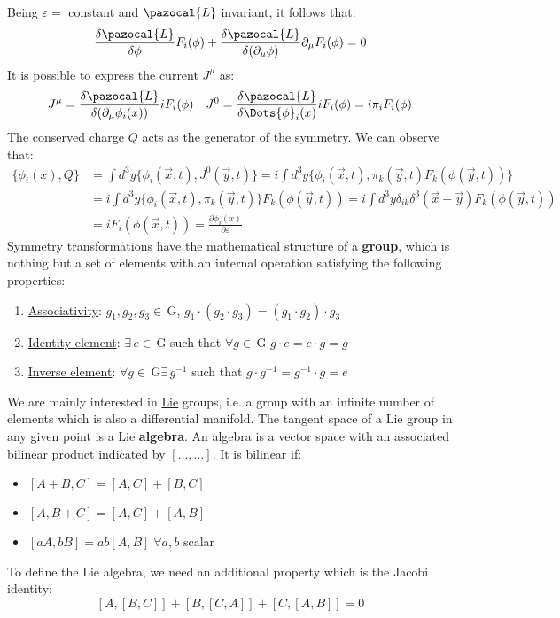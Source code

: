 \documentclass[../main.tex]{subfiles}
\begin{document}
Being $\varepsilon=$ constant and $\pazocal{L}$ invariant, it follows that:
\[
\frac{\delta\pazocal{L}}{\delta\phi}F_i(\phi)+\frac{\delta\pazocal{L}}{\delta(\partial_\mu\phi)}\partial_\mu F_i(\phi)=0
\]
It is possible to express the current $J^\mu$ as:
\[
J^\mu=\frac{\delta\pazocal{L}}{\delta(\partial_\mu\phi_i(x))}iF_i(\phi) \quad J^0=\frac{\delta\pazocal{L}}{\delta\Dots{\phi}_i(x)}iF_i(\phi)=i\pi_iF_i(\phi)
\]
The conserved charge $Q$ acts as the generator of the symmetry. We can observe that:
\begin{align*}
\{\phi_i(x),Q\}&=\int d^3y\{\phi_i(\Vec{x},t),J^0(\Vec{y},t)\}=i\int d^3y\{\phi_i(\Vec{x},t),\pi_k(\Vec{y},t)F_k(\phi(\Vec{y},t))\}\\
&=i\int d^3y\{\phi_i(\Vec{x},t),\pi_k(\Vec{y},t)\}F_k(\phi(\Vec{y},t))=i\int d^3y\delta_{ik}\delta^3(\Vec{x}-\Vec{y})F_k(\phi(\Vec{y},t))\\
&=iF_i(\phi(\Vec{x},t))=\frac{\partial\phi_i(x)}{\partial\varepsilon}
\end{align*}
Symmetry transformations have the mathematical structure of a \textbf{group}\cite{gruppi}, which is nothing but a set of elements with an internal operation satisfying the following properties:
\begin{enumerate}
    \item \underline{Associativity}: $g_1,g_2,g_3\in$\,G, $g_1\cdot(g_2\cdot g_3)=(g_1\cdot g_2)\cdot g_3$ 
    \item \underline{Identity element}: $\exists\,e\in$\,G such that $\forall g\in$\,G $g\cdot e=e\cdot g=g$
    \item \underline{Inverse element}: $\forall g\in$\,G$\exists\,g^{-1}$ such that $g\cdot g^{-1}=g^{-1}\cdot g=e$
\end{enumerate}
We are mainly interested in \href{https://en.wikipedia.org/wiki/Sophus_Lie}{Lie} groups, i.e. a group with an infinite number of elements which is also a differential manifold. The tangent space of a Lie group in any given point is a Lie \textbf{algebra}. An algebra is a vector space with an associated bilinear product indicated by $[\dots,\dots]$. It is bilinear if:
\begin{itemize}
    \item $[A+B,C]=[A,C]+[B,C]$
    \item $[A,B+C]=[A,C]+[A,B]$
    \item $[aA,bB]=ab[A,B] \; \forall a,b$ scalar
\end{itemize}
To define the Lie algebra, we need an additional property which is the Jacobi identity:
\[
[A,[B,C]]+[B,[C,A]]+[C,[A,B]]=0
\]
\end{document}
